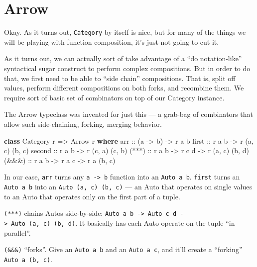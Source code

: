 \documentclass[]{article}
\newenvironment{Shaded}{}{}
\newcommand{\DataTypeTok}[1]{\textcolor[rgb]{0.56,0.13,0.00}{#1}}
\newcommand{\KeywordTok}[1]{\textcolor[rgb]{0.00,0.44,0.13}{\textbf{#1}}}
\newcommand{\NormalTok}[1]{#1}
\newcommand{\OtherTok}[1]{\textcolor[rgb]{0.00,0.44,0.13}{#1}}
\begin{document}
\hypertarget{arrow}{%
\section{Arrow}\label{arrow}}

Okay. As it turns out, \texttt{Category} by itself is nice, but for many of the
things we will be playing with function composition, it's just not going to cut
it.

As it turns out, we can actually sort of take advantage of a ``do
notation-like'' syntactical sugar construct to perform complex compositions. But
in order to do that, we first need to be able to ``side chain'' compositions.
That is, split off values, perform different compositions on both forks, and
recombine them. We require sort of basic set of combinators on top of our
Category instance.

The Arrow typeclass was invented for just this --- a grab-bag of combinators
that allow such side-chaining, forking, merging behavior.

\begin{Shaded}
\begin{Highlighting}[]
\KeywordTok{class} \DataTypeTok{Category}\NormalTok{ r }\OtherTok{=>} \DataTypeTok{Arrow}\NormalTok{ r }\KeywordTok{where}
\OtherTok{    arr    ::}\NormalTok{ (a }\OtherTok{{-}>}\NormalTok{ b) }\OtherTok{{-}>}\NormalTok{ r a b}
\OtherTok{    first  ::}\NormalTok{ r a b }\OtherTok{{-}>}\NormalTok{ r (a, c) (b, c)}
\OtherTok{    second ::}\NormalTok{ r a b }\OtherTok{{-}>}\NormalTok{ r (c, a) (c, b)}
\OtherTok{    (***)  ::}\NormalTok{ r a b }\OtherTok{{-}>}\NormalTok{ r c d }\OtherTok{{-}>}\NormalTok{ r (a, c) (b, d)}
\OtherTok{    (\&\&\&)  ::}\NormalTok{ r a b }\OtherTok{{-}>}\NormalTok{ r a c }\OtherTok{{-}>}\NormalTok{ r a (b, c)}
\end{Highlighting}
\end{Shaded}

In our case, \texttt{arr} turns any \texttt{a\ -\textgreater{}\ b} function into
an \texttt{Auto\ a\ b}. \texttt{first} turns an \texttt{Auto\ a\ b} into an
\texttt{Auto\ (a,\ c)\ (b,\ c)} --- an Auto that operates on single values to an
Auto that operates only on the first part of a tuple.

\texttt{(***)} chains Autos side-by-side:
\texttt{Auto\ a\ b\ -\textgreater{}\ Auto\ c\ d\ -\textgreater{}\ Auto\ (a,\ c)\ (b,\ d)}.
It basically has each Auto operate on the tuple ``in parallel''.

\texttt{(\&\&\&)} ``forks''. Give an \texttt{Auto\ a\ b} and an
\texttt{Auto\ a\ c}, and it'll create a ``forking'' \texttt{Auto\ a\ (b,\ c)}.
\end{document}

